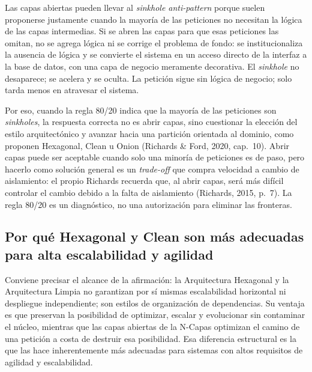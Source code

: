 \documentclass[12pt,a4paper]{article}
\begin{document}
Las capas abiertas pueden llevar al \emph{sinkhole anti-pattern} porque suelen proponerse justamente cuando la mayoría de las peticiones no necesitan la lógica de las capas intermedias. Si se abren las capas para que esas peticiones las omitan, no se agrega lógica ni se corrige el problema de fondo: se institucionaliza la ausencia de lógica y se convierte el sistema en un acceso directo de la interfaz a la base de datos, con una capa de negocio meramente decorativa. El \emph{sinkhole} no desaparece; se acelera y se oculta. La petición sigue sin lógica de negocio; solo tarda menos en atravesar el sistema.

Por eso, cuando la regla 80/20 indica que la mayoría de las peticiones son \emph{sinkholes}, la respuesta correcta no es abrir capas, sino cuestionar la elección del estilo arquitectónico y avanzar hacia una partición orientada al dominio, como proponen Hexagonal, Clean u Onion (Richards \& Ford, 2020, cap.~10). Abrir capas puede ser aceptable cuando solo una minoría de peticiones es de paso, pero hacerlo como solución general es un \emph{trade-off} que compra velocidad a cambio de aislamiento: el propio Richards recuerda que, al abrir capas, será más difícil controlar el cambio debido a la falta de aislamiento (Richards, 2015, p.~7). La regla 80/20 es un diagnóstico, no una autorización para eliminar las fronteras.

\subsection{Por qué Hexagonal y Clean son más adecuadas para alta escalabilidad y agilidad}

Conviene precisar el alcance de la afirmación: la Arquitectura Hexagonal y la Arquitectura Limpia no garantizan por sí mismas escalabilidad horizontal ni despliegue independiente; son estilos de organización de dependencias. Su ventaja es que preservan la posibilidad de optimizar, escalar y evolucionar sin contaminar el núcleo, mientras que las capas abiertas de la N-Capas optimizan el camino de una petición a costa de destruir esa posibilidad. Esa diferencia estructural es la que las hace inherentemente más adecuadas para sistemas con altos requisitos de agilidad y escalabilidad.
\end{document}
